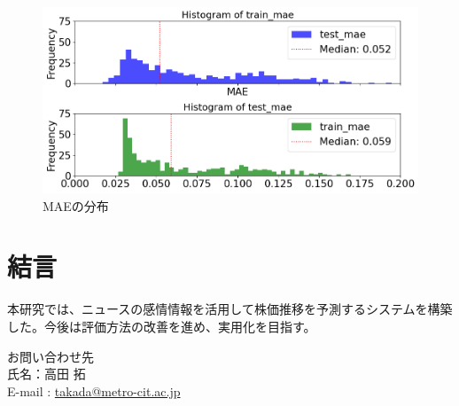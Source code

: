 \documentclass[a4paper, 10pt]{article}
\begin{document}
\begin{figure}[h]
    \centering
    \includegraphics[width=0.9\columnwidth]{./assets/graph.png}
    \caption{MAEの分布}
\end{figure}



\section{結言}


本研究では、ニュースの感情情報を活用して株価推移を予測するシステムを構築した。今後は評価方法の改善を進め、実用化を目指す。


\noindent
{}

お問い合わせ先\\
氏名：高田 拓 \\
E-mail : \href{mailto:takada@metro-cit.ac.jp}{takada@metro-cit.ac.jp}
\end{document}
